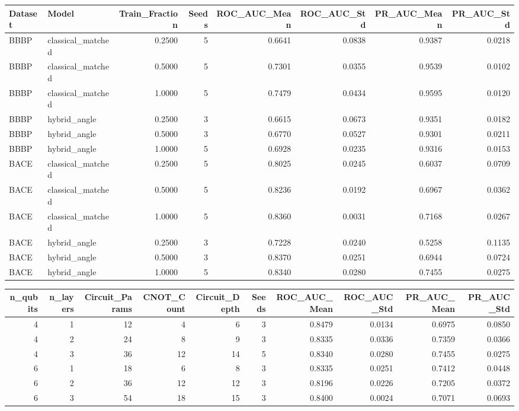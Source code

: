 \begin{tabular}{llrrrrrr}
\toprule
Dataset & Model & Train_Fraction & Seeds & ROC_AUC_Mean & ROC_AUC_Std & PR_AUC_Mean & PR_AUC_Std \\
\midrule
BBBP & classical_matched & 0.2500 & 5 & 0.6641 & 0.0838 & 0.9387 & 0.0218 \\
BBBP & classical_matched & 0.5000 & 5 & 0.7301 & 0.0355 & 0.9539 & 0.0102 \\
BBBP & classical_matched & 1.0000 & 5 & 0.7479 & 0.0434 & 0.9595 & 0.0120 \\
BBBP & hybrid_angle & 0.2500 & 3 & 0.6615 & 0.0673 & 0.9351 & 0.0182 \\
BBBP & hybrid_angle & 0.5000 & 3 & 0.6770 & 0.0527 & 0.9301 & 0.0211 \\
BBBP & hybrid_angle & 1.0000 & 5 & 0.6928 & 0.0235 & 0.9316 & 0.0153 \\
BACE & classical_matched & 0.2500 & 5 & 0.8025 & 0.0245 & 0.6037 & 0.0709 \\
BACE & classical_matched & 0.5000 & 5 & 0.8236 & 0.0192 & 0.6967 & 0.0362 \\
BACE & classical_matched & 1.0000 & 5 & 0.8360 & 0.0031 & 0.7168 & 0.0267 \\
BACE & hybrid_angle & 0.2500 & 3 & 0.7228 & 0.0240 & 0.5258 & 0.1135 \\
BACE & hybrid_angle & 0.5000 & 3 & 0.8370 & 0.0251 & 0.6944 & 0.0724 \\
BACE & hybrid_angle & 1.0000 & 5 & 0.8340 & 0.0280 & 0.7455 & 0.0275 \\
\bottomrule
\end{tabular}


\begin{tabular}{rrrrrrrrrr}
\toprule
n_qubits & n_layers & Circuit_Params & CNOT_Count & Circuit_Depth & Seeds & ROC_AUC_Mean & ROC_AUC_Std & PR_AUC_Mean & PR_AUC_Std \\
\midrule
4 & 1 & 12 & 4 & 6 & 3 & 0.8479 & 0.0134 & 0.6975 & 0.0850 \\
4 & 2 & 24 & 8 & 9 & 3 & 0.8335 & 0.0336 & 0.7359 & 0.0366 \\
4 & 3 & 36 & 12 & 14 & 5 & 0.8340 & 0.0280 & 0.7455 & 0.0275 \\
6 & 1 & 18 & 6 & 8 & 3 & 0.8335 & 0.0251 & 0.7412 & 0.0448 \\
6 & 2 & 36 & 12 & 12 & 3 & 0.8196 & 0.0226 & 0.7205 & 0.0372 \\
6 & 3 & 54 & 18 & 15 & 3 & 0.8400 & 0.0024 & 0.7071 & 0.0693 \\
\bottomrule
\end{tabular}


